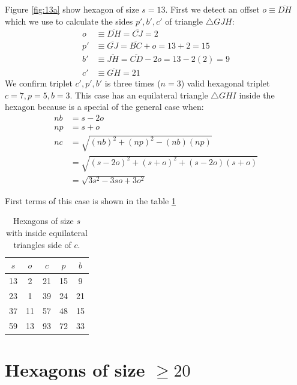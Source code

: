 \documentclass[11pt]{article}
\begin{document}
Figure \ref{fig:13a} show hexagon of size $s = 13$. First we detect an offset $o \equiv \overline{DH}$ which we use to calculate the sides $p',b',c'$ of triangle $\triangle{GJH}$:
\begin{align}
o &\equiv \overline{DH} = \overline{CJ} = 2 \nonumber\\
p' &\equiv \overline{GJ} = \overline{BC} + o = 13+2 = 15 \nonumber\\
b' &\equiv \overline{JH} = \overline{CD} - 2o = 13 - 2(2) = 9 \nonumber\\
c' &\equiv \overline{GH} = 21
\end{align}
We confirm triplet $c',p',b'$ is three times ($n=3$) valid hexagonal triplet $c=7,p=5,b=3$.
This case has an equilateral triangle $\triangle{GHI}$ inside the hexagon because is a special of the general case when:
\begin{align}
nb &= s - 2o \nonumber\\
np &= s + o \nonumber\\
nc &= \sqrt{(nb)^2 + (np)^2 - (nb)(np)} \nonumber\\
   &= \sqrt{(s - 2o)^2 + (s+o)^2 + (s - 2o)(s+o)} \nonumber\\
   &= \sqrt{3s^2 - 3so + 3o^2}
\end{align}

First terms of this case is shown in the table \ref{tbl:eqtriangles}
\begin{table}[H]
\begin{center}
\begin{tabular}{| c c | c c c |} 
 \hline
 $s$ & $o$ & $c$ & $p$ & $b$ \\ [0.5ex] 
 \hline\hline
  13 &  2 &  21 &  15 &  9 \\ \hline
  23 &  1 &  39 &  24 & 21 \\ \hline
  37 & 11 &  57 &  48 & 15 \\ \hline
  59 & 13 &  93 &  72 & 33 \\ \hline
\end{tabular}
\caption{Hexagons of size $s$ with inside equilateral triangles side of $c$.}
\label{tbl:eqtriangles}
\end{center}
\end{table}

\section{Hexagons of size $\ge 20$}
\end{document}
